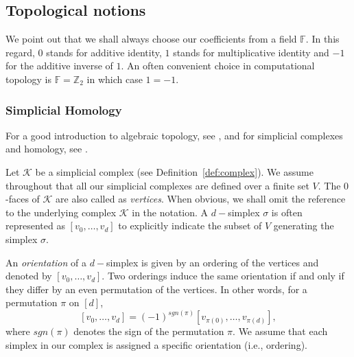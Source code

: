\documentclass[12pt]{amsart}
\newcommand{\red}[1]{\textcolor{red}{#1}}
\newcommand{\gt}[1]{\textcolor{blue}{#1}}
\renewcommand{\red}[1]{#1}
\renewcommand{\gt}[1]{#1}
\newtheorem{definition}[theorem]{Definition}
\numberwithin{equation}{section}
\numberwithin{theorem}{section}
\newcommand{\1}{\mathbf{1}}
\def\F{\mathcal{F}}
\def\K{\mathcal{K}}
\def\bF{\mathbb{F}}
\def\bZ{\mathbb{Z}}
\begin{document}
\subsection{Topological notions}
\label{sec:topology}

We point out that we shall always choose our coefficients from a field $\bF$. In this regard, $0$ stands for additive identity, $1$ stands for multiplicative identity and $-1$ for the additive inverse of $1$. An often convenient choice in computational topology is $\bF = \bZ_2$ in which case $1 = -1$.

\subsubsection{Simplicial Homology}
\label{sec:simplicial_homology}
For a good introduction to algebraic topology, see \cite{Hatcher02}, and for simplicial complexes and homology, see \cite{Edelsbrunner10,Munkres84}.

Let $\K$ be a simplicial complex (see Definition~\ref{def:complex}). We assume throughout that all our simplicial complexes are defined over a finite set $V$. %
The $0$-faces of $\K$ are also called as {\em vertices}. When obvious, we shall omit the reference to the underlying complex $\K$ in the notation. A $d-$simplex $\sigma$ is often represented as $[v_0,\ldots,v_d]$ to explicitly indicate the subset of $V$ generating the simplex $\sigma$.

An {\em orientation} of a $d-$simplex is given by an ordering of the vertices and denoted by $[v_0, \ldots, v_d].$ Two orderings induce the same orientation if and only if they differ by an even permutation of the vertices. In other words, for a permutation $\pi$ on $[d]$,
%
$$ [v_0,\ldots,v_d] = (-1)^{sgn(\pi)}[v_{\pi(0)},\ldots,v_{\pi(d)}], $$
%
\gt{where $sgn(\pi)$ denotes the sign of the permutation $\pi.$}
We assume that each simplex in our complex is assigned a specific orientation (i.e., ordering).
\end{document}
